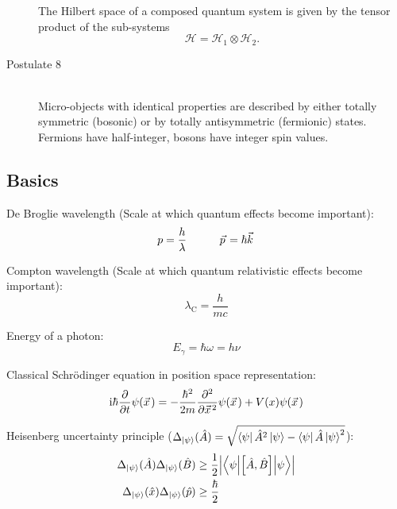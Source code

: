 \begin{description}
				The Hilbert space of a composed quantum system is given by the tensor product of the sub-systems
				\begin{equation}
					\mathcal{H} = \mathcal{H}_1 \otimes \mathcal{H}_2.
				\end{equation}
			\item[Postulate 8]\hfill \\
				Micro-objects with identical properties are described by either totally symmetric (bosonic) or by totally antisymmetric (fermionic) states. Fermions have half-integer, bosons have integer spin values.
		\end{description}

	\subsection{Basics}
		\noindent
		De Broglie wavelength (Scale at which quantum effects become important):
		\begin{equation}
			p = \frac{h}{\lambda}
			\hsp
			\vec{p} = \hbar \vec{k}
		\end{equation}

		\noindent
		Compton wavelength (Scale at which quantum relativistic effects become important):
		\begin{equation}
			\lambda_\mathrm{C} = \frac{h}{mc}
		\end{equation}

		\noindent
		Energy of a photon:
		\begin{equation}
			E_\gamma = \hbar\omega = h\nu
		\end{equation}

		\noindent
		Classical Schrödinger equation in position space representation:
		\begin{equation}
			\i\hbar\pdv{t}\psi(\vec{x}) = -\frac{\hbar^2}{2m}\frac{\partial^2}{\partial \vec{x}^2}\psi(\vec{x}) + V(x)\psi(\vec{x})
		\end{equation}

		\noindent
		Heisenberg uncertainty principle ($\Delta_{\Ket{\psi}} (\hat{A}) = \sqrt{\Bra{\psi}\hat{A}^2\Ket{\psi} - \Bra{\psi}\hat{A}\Ket{\psi}^2}$):
		\begin{equation}
			\begin{aligned}
				\Delta_{\Ket{\psi}}(\hat{A}) \Delta_{\Ket{\psi}}(\hat{B}) &\ge
				\frac{1}{2} \abs{\mel**{\psi}{\comm{\hat{A}}{\hat{B}}}{\psi}} \\
				\Delta_{\Ket{\psi}}(\hat{x}) \Delta_{\Ket{\psi}}(\hat{p}) &\ge
				\frac{\hbar}{2}
			\end{aligned}
		\end{equation}

